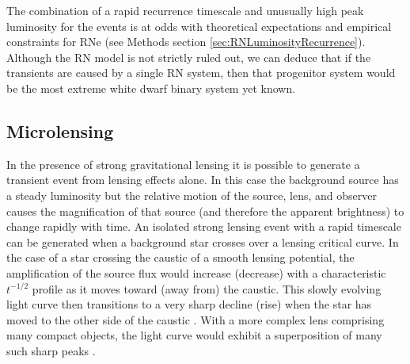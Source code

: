 The combination of a rapid recurrence timescale and unusually high
peak luminosity for the \spock events is at odds with theoretical
expectations and empirical constraints for RNe (see Methods section
\ref{sec:RNLuminosityRecurrence}). Although the RN model is not
strictly ruled out, we can deduce that if the \spock transients are
caused by a single RN system, then that progenitor system would be the
most extreme white dwarf binary system yet known.




\subsection{Microlensing}\label{sec:MicroLensing}

In the presence of strong gravitational lensing it is possible to
generate a transient event from lensing effects alone.  In this case
the background source has a steady luminosity but the relative motion
of the source, lens, and observer causes the magnification of that
source (and therefore the apparent brightness) to change rapidly with
time.  An isolated strong lensing event with a rapid timescale can be
generated when a background star crosses over a lensing critical
curve.  In the case of a star crossing the caustic of a smooth lensing
potential, the amplification of the source flux would increase
(decrease) with a characteristic $t^{-1/2}$ profile as it moves toward
(away from) the caustic. This slowly evolving light curve then
transitions to a very sharp decline (rise) when the star has moved to
the other side of the caustic \citep{Schneider:1986,
  MiraldaEscude:1991}.  With a more complex lens comprising many
compact objects, the light curve would exhibit a superposition of many
such sharp peaks \citep{Lewis:1993}.

